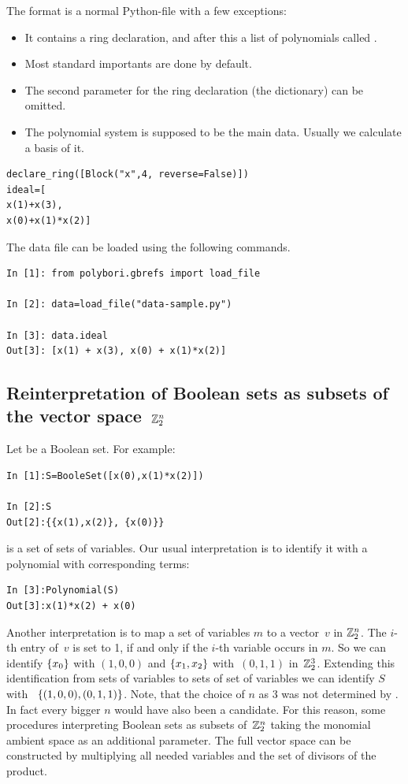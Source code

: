The format is a normal Python-file with a few exceptions:
\begin{itemize}
    \item It contains a ring declaration, and after this a list of polynomials called .
    \item Most \PolyBoRi standard importants are done by default.
    \item The second parameter for the ring declaration (the  dictionary) can be omitted.
    \item The polynomial system  is supposed to be the main data.
    Usually we calculate a \Groebner basis of it.
\end{itemize}
\begin{lstlisting}
declare_ring([Block("x",4, reverse=False)])
ideal=[
x(1)+x(3),
x(0)+x(1)*x(2)]  
\end{lstlisting}
%
The data file can be loaded using the following commands.
%
\begin{lstlisting}
In [1]: from polybori.gbrefs import load_file

In [2]: data=load_file("data-sample.py")

In [3]: data.ideal
Out[3]: [x(1) + x(3), x(0) + x(1)*x(2)]
\end{lstlisting}

\subsection{Reinterpretation of Boolean sets as subsets of the vector space~$\mathbb{Z}_2^n$}
\label{reinterpretation-of-zdd}
Let  be a Boolean set. For example:
\begin{lstlisting}
In [1]:S=BooleSet([x(0),x(1)*x(2)])

In [2]:S
Out[2]:{{x(1),x(2)}, {x(0)}}
\end{lstlisting}

 is a set of sets of variables.
Our usual interpretation is to identify it with a polynomial with corresponding terms:
\begin{lstlisting}
In [3]:Polynomial(S)
Out[3]:x(1)*x(2) + x(0)
\end{lstlisting}
Another interpretation is to map a set of variables $m$ to a vector~$v$ in $\mathbb{Z}_2^n$.
The $i$-th entry of~$v$ is set to 1, if and only if the $i$-th variable occurs in $m$.
So we can identify $\{x_0\}$ with $(1,0,0)$ and $\{x_1,x_2\}$ with~$(0,1,1)$ in~$\mathbb{Z}_2^3$.
Extending this identification from sets of variables  to sets of set of variables we can identify $S$ with~%
$\{(1,0,0), (0,1,1)\}$.
Note, that the choice of $n$ as $3$ was not determined by . In fact every bigger $n$ would have also been a candidate.
For this reason, some procedures interpreting Boolean sets as subsets of~$\mathbb{Z}_2^n$ taking the monomial ambient space as an additional parameter.
The full vector space can be constructed by multiplying all needed variables and the set of divisors of the product.

